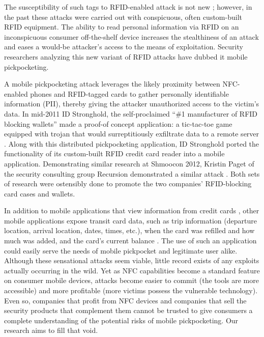 \documentclass{IEEEtran}
\begin{document}
The susceptibility of such tags to RFID-enabled attack is not new \cite{picking-virtual-pockets} \cite{eavesdropping-attacks-hfrfid-tokens}; however, in the past these attacks were carried out with conspicuous, often custom-built RFID equipment.  The ability to read personal information via RFID on an inconspicuous consumer off-the-shelf device increases the stealthiness of an attack and eases a would-be attacker's access to the means of exploitation.  Security researchers analyzing this new variant of RFID attacks have dubbed it mobile pickpocketing.  

A mobile pickpocketing attack leverages the likely proximity between NFC-enabled phones and RFID-tagged cards to gather personally identifiable information (PII), thereby giving the attacker unauthorized access to the victim's data.  In mid-2011 ID Stronghold, the self-proclaimed ``\#1 manufacturer of RFID blocking wallets'' \cite{idstronghold-1} made a proof-of concept application:  a tic-tac-toe game equipped with trojan that would surreptitiously exfiltrate data to a remote server \cite{11alive-electronic-pickpocket-apps}.  Along with this distributed pickpocketing application, ID Stronghold ported the functionality of its custom-built RFID credit card reader into a mobile application.  Demonstrating similar research at Shmoocon 2012, Kristin Paget of the security consulting group Recursion demonstrated a similar attack \cite{forbes-1}.  Both sets of research were ostensibly done to promote the two companies' RFID-blocking card cases and wallets.  

In addition to mobile applications that view information from credit cards \cite{idstronghold-1}, other mobile applications expose transit card data, such as trip information (departure location, arrival location, dates, times, etc.), when the card was refilled and how much was added, and the card's current balance \cite{farebot-1}.  The use of such an application could easily serve the needs of mobile pickpocket and legitimate user alike.  Although these sensational attacks seem viable, little record exists of any exploits actually occurring in the wild.  Yet as NFC capabilities become a standard feature on consumer mobile devices, attacks become easier to commit (the tools are more accessible) and more profitable (more victims possess the vulnerable technology).  Even so, companies that profit from NFC devices and companies that sell the security products that complement them cannot be trusted to give consumers a complete understanding of the potential risks of mobile pickpocketing.  Our research aims to fill that void.
\end{document}
